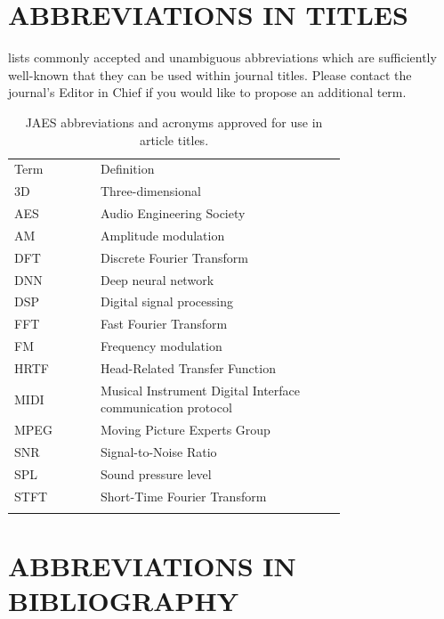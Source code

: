 \documentclass[fleqn]{jaes}
\begin{document}
\section{\MakeUppercase{Abbreviations in titles}}\label{sec:titleabbreviations}

 lists commonly accepted and unambiguous abbreviations which are sufficiently well-known that they can be used within journal titles. Please contact the journal's Editor in Chief if you would like to propose an additional term. 

\begin{table}[!ht]
    \caption{JAES abbreviations and acronyms approved for use in article titles.}\label{table:titleabbreviations}
    \begin{tabular}{@{}lp{0.74\linewidth}}
    \toprule
        Term & Definition \\
    \colrule
        3D & Three-dimensional \\
        AES & Audio Engineering Society \\
        AM & Amplitude modulation \\
        DFT & Discrete Fourier Transform \\
        DNN & Deep neural network \\
        DSP & Digital signal processing \\
        FFT & Fast Fourier Transform \\
        FM & Frequency modulation \\
        HRTF & Head-Related Transfer Function \\
        MIDI & Musical Instrument Digital Interface communication protocol \\
        MPEG & Moving Picture Experts Group \\
        SNR & Signal-to-Noise Ratio \\
        SPL & Sound pressure level \\
        STFT & Short-Time Fourier Transform \\
    \botrule
    \end{tabular}
\end{table}

\section{\MakeUppercase{Abbreviations in bibliography}}\label{sec:biblioabbreviations} 
\end{document}
